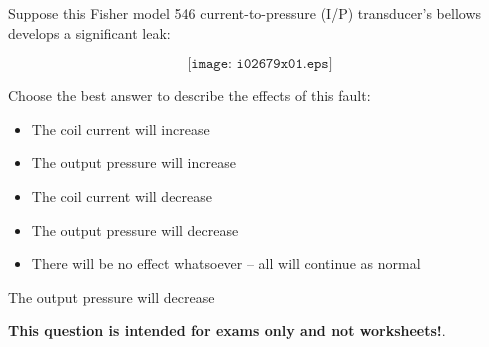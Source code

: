 

Suppose this Fisher model 546 current-to-pressure (I/P) transducer's bellows develops a significant leak:

$$\texttt{[image: i02679x01.eps]}$$

\noindent
Choose the best answer to describe the effects of this fault:

\begin{itemize}
\item{} The coil current will increase
\vskip 10pt
\item{} The output pressure will increase 
\vskip 10pt
\item{} The coil current will decrease 
\vskip 10pt
\item{} The output pressure will decrease 
\vskip 10pt
\item{} There will be no effect whatsoever -- all will continue as normal
\end{itemize}







The output pressure will decrease 







{\bf This question is intended for exams only and not worksheets!}.



